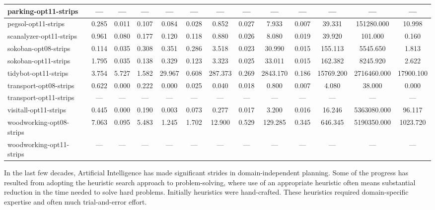 \documentclass[a4paper,12pt]{article}
\begin{document}
\begin{table}[]
\begin{tabular}{l@{\hspace{6pt}} *{12}{c}}
parking-opt11-strips    & --- & --- & --- & --- & --- & --- & --- & --- & --- & --- & --- & --- \\ \hline
pegsol-opt11-strips     & 0.285 & 0.011 & 0.107 & 0.084 & 0.028 & 0.852 & 0.027 & 7.933 & 0.007 & 39.331 & 151280.000 & 10.998 \\ \hline
scanalyzer-opt11-strips & 0.961 & 0.080 & 0.177 & 0.120 & 0.118 & 0.880 & 0.026 & 8.080 & 0.019 & 39.920 & 101.000 & 0.160 \\ \hline
sokoban-opt08-strips    & 0.114 & 0.035 & 0.308 & 0.351 & 0.286 & 3.518 & 0.023 & 30.990 & 0.015 & 155.113 & 5545.650 & 1.813 \\ \hline
sokoban-opt11-strips    & 1.795 & 0.035 & 0.138 & 0.329 & 0.123 & 3.323 & 0.025 & 33.011 & 0.015 & 162.382 & 8245.920 & 2.622 \\ \hline
tidybot-opt11-strips    & 3.754 & 5.727 & 1.582 & 29.967 & 0.608 & 287.373 & 0.269 & 2843.170 & 0.186 & 15769.200 & 2716460.000 & 17900.100 \\ \hline
transport-opt08-strips  & 0.622 & 0.000 & 0.222 & 0.000 & 0.025 & 0.040 & 0.018 & 0.800 & 0.007 & 4.080 & 38.000 & 0.000 \\ \hline
transport-opt11-strips  & --- & --- & --- & --- & --- & --- & --- & --- & --- & --- & --- & --- \\ \hline
visitall-opt11-strips   & 0.445 & 0.000 & 0.190 & 0.003 & 0.073 & 0.277 & 0.017 & 3.200 & 0.016 & 16.246 & 5363080.000 & 96.117 \\ \hline
woodworking-opt08-strips& 7.063 & 0.095 & 5.483 & 1.245 & 1.702 & 12.900 & 0.529 & 129.285 & 0.345 & 646.345 & 5190350.000 & 1023.720 \\ \hline
woodworking-opt11-strips& --- & --- & --- & --- & --- & --- & --- & --- & --- & --- & --- & --- \\ \hline
\end{tabular}
\end{table}


In the last few decades, Artificial Intelligence has made significant strides in domain-independent planning. Some of the progress has resulted from adopting the heuristic search approach to problem-solving, where use of an appropriate heuristic often means substantial reduction in the time needed to solve hard problems. Initially heuristics were hand-crafted. These heuristics required domain-specific expertise and often much trial-and-error effort.\\
\end{document}
